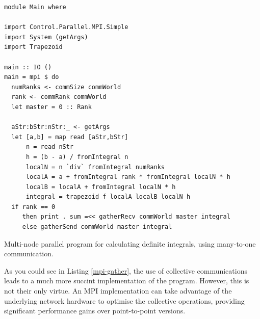 \documentclass{tmr}
\begin{document}



\begin{listing}
\begin{Verbatim}
module Main where

import Control.Parallel.MPI.Simple
import System (getArgs)
import Trapezoid

main :: IO ()
main = mpi $ do
  numRanks <- commSize commWorld
  rank <- commRank commWorld
  let master = 0 :: Rank

  aStr:bStr:nStr:_ <- getArgs
  let [a,b] = map read [aStr,bStr]
      n = read nStr
      h = (b - a) / fromIntegral n
      localN = n `div` fromIntegral numRanks
      localA = a + fromIntegral rank * fromIntegral localN * h
      localB = localA + fromIntegral localN * h
      integral = trapezoid f localA localB localN h
  if rank == 0
     then print . sum =<< gatherRecv commWorld master integral
     else gatherSend commWorld master integral
\end{Verbatim}
\caption{Multi-node parallel program for calculating definite
  integrals, using many-to-one communication. \label{mpi-gather}}
\end{listing}

As you could see in Listing \ref{mpi-gather},
the use of collective communications
leads to a much more succint implementation of the program.
However, this is not their only virtue. An MPI implementation
can take advantage of the underlying network hardware to optimise
the collective operations, providing significant performance
gains over point-to-point versions.
\end{document}
